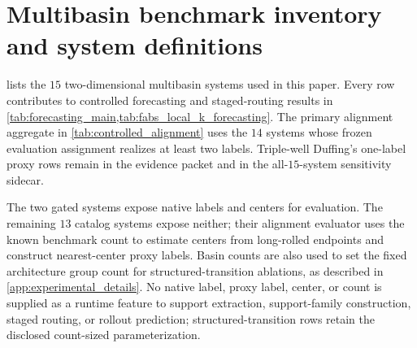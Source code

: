 \section{Multibasin benchmark inventory and system definitions}
\label{app:controlled_inventory}

 lists the \(15\) two-dimensional multibasin systems used in this paper.
Every row contributes to controlled forecasting and staged-routing results in
\cref{tab:forecasting_main,tab:fabs_local_k_forecasting}.  The primary
alignment aggregate in \cref{tab:controlled_alignment} uses the \(14\) systems
whose frozen evaluation assignment realizes at least two labels.  Triple-well
Duffing's one-label proxy rows remain in the evidence packet and in the
all-\(15\)-system sensitivity sidecar.

The two gated systems expose native labels and centers for evaluation.  The
remaining \(13\) catalog systems expose neither; their alignment evaluator uses
the known benchmark count to estimate centers from long-rolled endpoints and
construct nearest-center proxy labels.  Basin counts are also used to set the
fixed architecture group count for structured-transition ablations, as
described in \cref{app:experimental_details}.  No native label, proxy label,
center, or count is supplied as a runtime feature to support extraction,
support-family construction, staged routing, or rollout prediction;
structured-transition rows retain the disclosed count-sized parameterization.

